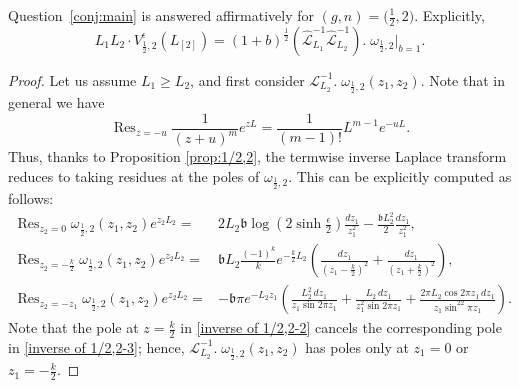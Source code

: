\documentclass[10pt,a4paper]{amsart}
\DeclareMathOperator*{\Res}{Res}
\begin{document}
\begin{theorem}\label{thm:1/2,2} Question~\ref{conj:main} is answered affirmatively for $(g,n)=\big(\frac12,2\big)$. Explicitly,
 \begin{equation}
     L_1L_2\cdot V_{\frac12,2}^\epsilon(L_{[2]})= (1+b)^{\frac12}(\hat{\mathcal{L}}_{L_1}^{-1} \hat{\mathcal{L}}_{L_2}^{-1}).\; \omega_{\frac12,2}\Big|_{b=1}.
    \end{equation}
\end{theorem}

\begin{proof}
Let us assume $L_1\geq L_2$, and first consider $\mathcal{L}^{-1}_{L_2}.\;\omega_{\frac12,2}(z_1,z_2)$. Note that in general we have
\[\Res_{z=-u}\frac{1}{(z+u)^m}e^{z L} = \frac{1}{(m-1)!} L^{m-1} e^{-u L}.\]
Thus, thanks to Proposition \ref{prop:1/2,2}, the termwise inverse Laplace transform reduces to taking residues at the poles of $\omega_{\frac12,2}$. This can be explicitly computed as follows:
    \begin{align}
        \Res_{z_2=0}\omega_{\frac12,2}(z_1,z_2)e^{z_2L_2}=&2L_2\mathfrak{b}\log\left(2\sinh\frac{\epsilon}{2}\right)\frac{dz_1}{z_1^2}-\frac{\mathfrak{b}L_2^2}{2}\frac{dz_1}{z_1^2},\label{inverse of 1/2,2-1}\\
        \Res_{z_2=-\frac{k}{2}}\omega_{\frac12,2}(z_1,z_2)e^{z_2L_2}=&\mathfrak{b}L_2\frac{(-1)^k}{k}e^{-\frac{k}{2}L_2}\left(\frac{dz_1}{(z_1-\frac{k}{2})^2}+\frac{dz_1}{(z_1+\frac{k}{2})^2}\right),\label{inverse of 1/2,2-2}\\
        \Res_{z_2=-z_1}\omega_{\frac12,2}(z_1,z_2)e^{z_2L_2}=&-\mathfrak{b}\pi e^{-L_2 z_1}\left(\frac{L_2^2\,dz_1}{z_1\sin2\pi z_1}+\frac{L_2\,dz_1}{z_1^2\sin2\pi z_1}+\frac{2\pi L_2\cos2\pi z_1\,dz_1}{z_1\sin^22\pi z_1}\right).\label{inverse of 1/2,2-3}
    \end{align}
Note that the pole at $z=\frac{k}{2}$ in \eqref{inverse of 1/2,2-2} cancels the corresponding pole in \eqref{inverse of 1/2,2-3}; hence, $\mathcal{L}^{-1}_{L_2}.\;\omega_{\frac12,2}(z_1,z_2)$ has poles only at $z_1=0$ or $z_1=-\frac{k}{2}$.


\end{proof}
\end{document}
